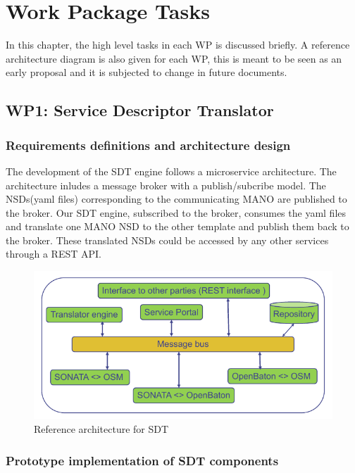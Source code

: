 \chapter{Work Package Tasks}
\label{ch:wptasks}

In this chapter, the high level tasks in each WP is discussed briefly. A reference architecture diagram is also given for each WP, this is meant to be seen as an early proposal and it is subjected to change in future documents.

\section{WP1: Service Descriptor Translator}

\subsection{Requirements definitions and architecture design}

The development of the SDT engine follows a microservice architecture. The architecture inludes a message broker with a publish/subcribe model. The NSDs(yaml files) corresponding to the communicating MANO are published to the broker. Our SDT engine, subscribed to the broker, consumes the yaml files and translate one MANO NSD to the other template and publish them back to the broker. These translated NSDs could be accessed by any other services through a REST API.
\begin{figure}[h]
	\centering
	\includegraphics[width=0.9\linewidth]{figures/wp1Arch}
	\caption{Reference architecture for SDT \cite{WPDescriptionsPDF}}
	\label{fig:wp1arch}
\end{figure}

\subsection{Prototype implementation of SDT components}

